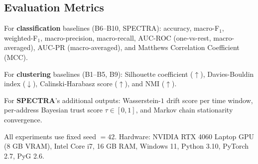 \documentclass[journal]{IEEEtran}
\begin{document}

\subsection{Evaluation Metrics}
\label{subsec:metrics}

For \textbf{classification} baselines (B6--B10, SPECTRA): accuracy,
macro-F$_1$, weighted-F$_1$, macro-precision, macro-recall,
AUC-ROC (one-vs-rest, macro-averaged), AUC-PR (macro-averaged),
and Matthews Correlation Coefficient (MCC).

For \textbf{clustering} baselines (B1--B5, B9):
Silhouette coefficient ($\uparrow$), Davies-Bouldin index ($\downarrow$),
Calinski-Harabasz score ($\uparrow$), and NMI ($\uparrow$).

For \textbf{SPECTRA}'s additional outputs: Wasserstein-$1$ drift score
per time window, per-address Bayesian trust score $\tau \in [0,1]$,
and Markov chain stationarity convergence.

All experiments use fixed seed $= 42$.
Hardware: NVIDIA RTX 4060 Laptop GPU (8 GB VRAM), Intel Core i7,
16 GB RAM, Windows 11, Python 3.10, PyTorch 2.7, PyG 2.6.
\end{document}
